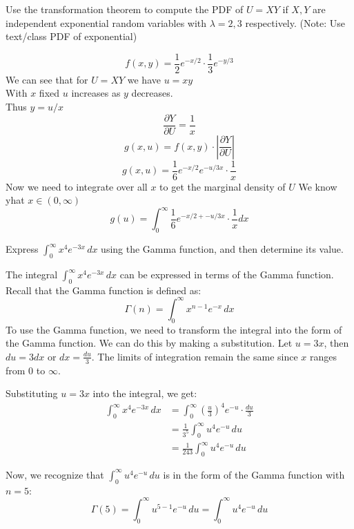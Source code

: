 \documentclass[answers,12pt,addpoints]{exam}
\begin{document}
\begin{questions}
    \question[10] Use the transformation theorem to compute the PDF of $U = XY$ if $X, Y$ are independent exponential random variables with $\lambda = 2, 3$ respectively. (Note: Use text/class PDF of exponential)

    \begin{solution}
        $$f(x,y) = \frac{1}{2}e^{-x/2} \cdot \frac{1}{3}e^{-y/3}$$
        We can see that for $U = XY$ we have $u = xy$\\
        With $x$ fixed $u$ increases as $y$ decreases.\\
        Thus $y = u/x$\\
        $$ \frac{\partial Y}{\partial U} = \frac{1}{x}$$
        $$g(x,u) = f(x,y) \cdot |\frac{\partial Y}{\partial U}|$$
        $$ g(x,u) = \frac{1}{6}e^{-x/2}e^{-u/3x} \cdot \frac{1}{x}$$
        Now we need to integrate over all $x$ to get the marginal density of $U$
        We know yhat $x \in (0, \infty)$ \\
        $$ g(u) = \int_0^\infty \frac{1}{6}e^{-x/2 + -u/3x} \cdot \frac{1}{x} dx$$
    \end{solution}
    
    \question[10] Express $\int_{0}^{\infty} x^4 e^{-3x} \, dx$ using the Gamma function, and then determine its value.
    \begin{solution}
        The integral $\int_{0}^{\infty} x^4 e^{-3x} \, dx$ can be expressed in terms of the Gamma function. Recall that the Gamma function is defined as:
        $$ \Gamma(n) = \int_{0}^{\infty} x^{n-1} e^{-x} \, dx $$
        To use the Gamma function, we need to transform the integral into the form of the Gamma function. We can do this by making a substitution. Let $u = 3x$, then $du = 3dx$ or $dx = \frac{du}{3}$. The limits of integration remain the same since $x$ ranges from $0$ to $\infty$.

        Substituting $u = 3x$ into the integral, we get:
        \begin{align*}
            \int_{0}^{\infty} x^4 e^{-3x} \, dx &= \int_{0}^{\infty} \left(\frac{u}{3}\right)^4 e^{-u} \cdot \frac{du}{3} \\
            &= \frac{1}{3^5} \int_{0}^{\infty} u^4 e^{-u} \, du \\
            &= \frac{1}{243} \int_{0}^{\infty} u^4 e^{-u} \, du
        \end{align*}

        Now, we recognize that $\int_{0}^{\infty} u^4 e^{-u} \, du$ is in the form of the Gamma function with $n = 5$:
        $$ \Gamma(5) = \int_{0}^{\infty} u^{5-1} e^{-u} \, du = \int_{0}^{\infty} u^4 e^{-u} \, du $$


\end{solution}
\end{questions}
\end{document}
